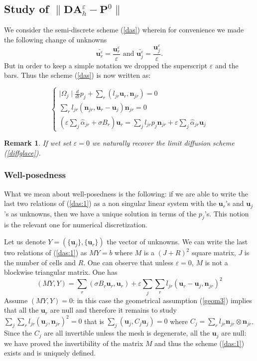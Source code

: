 \documentclass[a4paper,french,english,10pt]{article}
\newcommand\ljr{l_{jr}}
\newcommand\njr{\mathbf{n}_{jr}}
\newcommand\uu{\mathbf{u}}
\newcommand\eps{\varepsilon}
\newcommand\alj{\widehat{\alpha}_{jr}}
\newcommand\uj{\uu_j}
\newcommand\ur{\uu_r}
\newtheorem{remark}[theorem]{Remark}
\begin{document}
\subsection{Study of $\|\mathbf {DA}_h^\eps - \mathbf P^0\|$}


We consider the semi-discrete scheme (\ref{das}) wherein for  convenience we
made the following change of unknowns
\begin{equation} \label{eq:barn}
\bar{\uu_r^{\eps}}=\frac{\uu_r^{\eps}}{\eps}
\mbox{ and }
\bar{\uu_j^{\eps}}=\frac{\uu_j^{\eps}}{\eps}.
\end{equation} 
But in order to keep  a simple
notation we dropped the superscript $\eps$ and the bars. Thus the scheme
(\ref{das}) is now written as:


\begin{equation}\label{das:1}
\left\{ 
\begin{array}{l}
\displaystyle \mid\Omega_{j}\mid\frac{d}{dt} p_{j}+
\sum_{r}(l_{jr}\ur,\njr)=0\\
 \sum_{r}l_{jr} (\njr,\uu_r -\uu_j)\njr=0\\
 \left( \eps\sum_{j}\alj+  \sigma B_r\right)\ur=
\sum_{j}\ljr p_j\njr+\eps\sum_j\alj\uj
\end{array}
\right.
\end{equation}
\begin{remark}
If wet set $\eps=0$ we naturally recover the limit diffusion scheme (\ref{diffglace}).
\end{remark}

\subsubsection*{Well-posedness}

What we mean about well-posedness is the following:
if we are able to write the
last two relations of (\ref{das:1}) as a non singular linear system with the $\uu_r$'s and
$\uu_j$'s as unknowns, then we have a unique solution in terms of the $p_j$'s. 
This notion is the relevant one for numerical discretization.

Let us denote $Y=(\{\uu_j\}, \{\uu_r\})$  the vector of unknowns. We can write
 the last
two relations of (\ref{das:1}) as
$MY=b$ where $M$ is a $(J+R)^2$ square matrix, $J$ is the number of cells  and $R$.
One can observe that unless $\eps=0$, $M$ is not a blockwise
triangular matrix.
One has
$$(MY,Y)=\sum_r \left (\sigma B_r \uu_r, \uu_r\right ) 
+\eps\sum_j\sum_r \ljr \left( \uu_r- \uu_j,  \njr\right )^2$$
Assume  $(MY,Y)=0$: in this case   the geometrical assumption  (\ref{geom3}) implies that all
the $\uu_r$ are null and therefore it remains to study 
$
\sum_j\sum_r \ljr \left(  \uu_j,  \njr\right )^2=0
$ that is
$ \sum_j\left (\uu_j, C_j\uu_j\right )=0$ where $
C_j=\sum_r l_{jr} \mathbf n_{jr} \otimes \mathbf n_{jr}$.
 Since  the $C_j$ are all invertible
unless the mesh is degenerate, all the $\uu_j$ are null: we have proved the
invertibility of the matrix $M$ and thus the scheme (\ref{das:1}) exists and is
uniquely defined.
\end{document}

